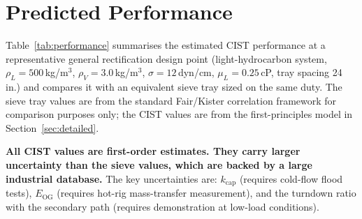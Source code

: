 \documentclass[11pt,letterpaper]{article}
\newcommand{\rhoL}{\rho_L}
\newcommand{\rhoV}{\rho_V}
\newcommand{\Eog}{E_{\mathrm{OG}}}
\begin{document}
\section{Predicted Performance}
\label{sec:performance}

Table~\ref{tab:performance} summarises the estimated CIST performance
at a representative general rectification design point (light-hydrocarbon
system, $\rhoL = 500$\,kg/m$^3$, $\rhoV = 3.0$\,kg/m$^3$,
$\sigma = 12$\,dyn/cm, $\mu_L = 0.25$\,cP, tray spacing 24\,in.)
and compares it with an equivalent sieve tray sized on the same duty.
The sieve tray values are from the standard Fair/Kister correlation
framework for comparison purposes only; the CIST values are from the
first-principles model in Section~\ref{sec:detailed}.

\textbf{All CIST values are first-order estimates.  They carry larger
uncertainty than the sieve values, which are backed by a large industrial
database.}  The key uncertainties are: $k_{\mathrm{cap}}$ (requires
cold-flow flood tests), $\Eog$ (requires hot-rig mass-transfer measurement),
and the turndown ratio with the secondary path (requires demonstration at
low-load conditions).
\end{document}
